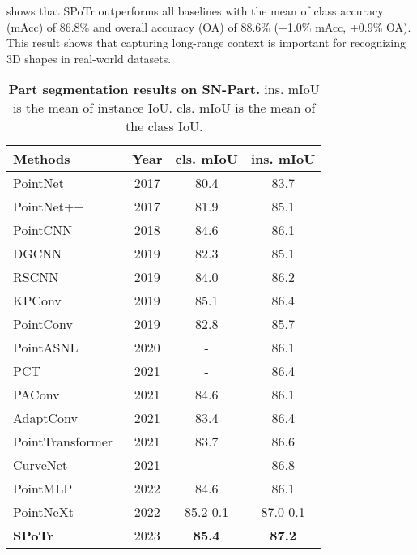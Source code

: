 \documentclass[10pt,twocolumn,letterpaper]{article}
\begin{document}
 shows that SPoTr outperforms all baselines with the mean of class accuracy (mAcc) of 86.8\% and overall accuracy (OA) of 88.6\% (+1.0\% mAcc, +0.9\% OA).
This result shows that capturing long-range context is important for recognizing 3D shapes in real-world datasets.
%
     \begin{table}[t]
  \centering
\setlength{\tabcolsep}{5pt}
  \begin{tabular}{l|c|cc}
    \toprule
    Methods & Year & cls. mIoU & ins. mIoU\\
    \midrule
    PointNet~\cite{qi2017pointnet}&2017 & 80.4& 83.7\\
    PointNet++~\cite{qi2017pointnet++}&2017 & 81.9 & 85.1 \\
    PointCNN~\cite{li2018pointcnn}&2018& 84.6 & 86.1 \\
    DGCNN~\cite{wang2019dynamic}&2019 & 82.3 & 85.1 \\
    RSCNN~\cite{liu2019relation} & 2019 & 84.0 & 86.2 \\
    KPConv~\cite{thomas2019kpconv}&2019 & 85.1&86.4 \\
    PointConv~\cite{wu2019pointconv}&2019 & 82.8 & 85.7 \\
    PointASNL~\cite{yan2020pointasnl}&2020 & - & 86.1 \\
    PCT~\cite{guo2021pct}&2021 & - & 86.4\\
    PAConv~\cite{xu2021paconv}&2021 & 84.6  &  86.1 \\
    AdaptConv~\cite{zhou2021adaptive}&2021 & 83.4 & 86.4\\
    PointTransformer~\cite{zhao2021point}&2021& 83.7 & 86.6 \\
    CurveNet~\cite{xiang2021walk}&2021 & - & 86.8 \\
    PointMLP~\cite{ma2022rethinking} & 2022 &84.6 & 86.1\\
    \rowcolor{LightYellow}PointNeXt~\cite{qian2022pointnext} & 2022& 85.2  0.1 & 87.0  0.1 \\
    \midrule
    \rowcolor{LightRed}\textbf{SPoTr} & 2023& \textbf{85.4} & \textbf{87.2}\\


    \bottomrule
  \end{tabular}
  \caption{\textbf{Part segmentation results on SN-Part.} ins. mIoU is the mean of instance IoU. cls. mIoU is the mean of the class IoU. 
  }
  \label{tab:shapenet}
\end{table} 
\end{document}
